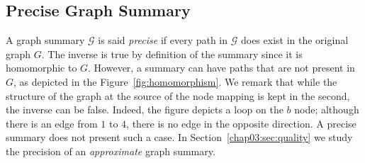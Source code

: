 %

\subsection{Precise Graph Summary}

A graph summary $\mathcal{G}$ is said \emph{precise} if every path in $\mathcal{G}$ does exist in the original graph $G$. The inverse is true by definition of the summary since it is homomorphic to $G$. However, a summary can have paths that are not present in $G$, as depicted in the Figure~\ref{fig:homomorphism}. We remark that while the structure of the graph at the source of the node mapping is kept in the second, the inverse can be false. Indeed, the figure depicts a loop on the $b$ node; although there is an edge from $1$ to $4$, there is no edge in the opposite direction. A precise summary does not present such a case. In Section~\ref{chap03:sec:quality} we study the precision of an \emph{approximate} graph summary.

